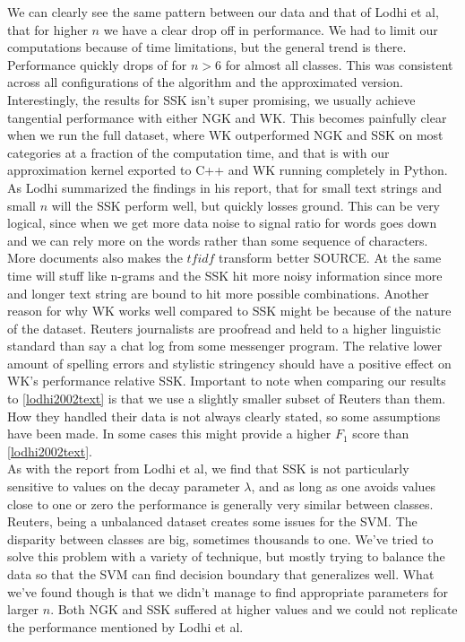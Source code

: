We can clearly see the same pattern between our data and that of Lodhi et al, that for higher $ n $ we have a clear drop off in performance. We had to limit our computations because of time limitations, but the general trend is there. Performance quickly drops of for $ n>6 $ for almost all classes. This was consistent across all configurations of the algorithm and the approximated version. Interestingly, the results for SSK isn't super promising, we usually achieve tangential performance with either NGK and WK. This becomes painfully clear when we run the full dataset, where WK outperformed NGK and SSK on most categories at a fraction of the computation time, and that is with our approximation kernel exported to C++ and WK running completely in Python. As Lodhi summarized the findings in his report, that for small text strings and small $ n $ will the SSK perform well, but quickly losses ground. This can be very logical, since when we get more data noise to signal ratio for words goes down and we can rely more on the words rather than some sequence of characters. More documents also makes the $ tfidf $ transform better SOURCE. At the same time will stuff like n-grams and the SSK hit more noisy information since more and longer text string are bound to hit more possible combinations. Another reason for why WK works well compared to SSK might be because of the nature of the dataset. Reuters journalists are proofread and held to a higher linguistic standard than say a chat log from some messenger program. The relative lower amount of spelling errors and stylistic stringency should have a positive effect on WK's performance relative SSK. Important to note when comparing our results to \ref{lodhi2002text} is that we use a slightly smaller subset of Reuters than them. How they handled their data is not always clearly stated, so some assumptions have been made. In some cases this might provide a higher $ F_1 $ score than \ref{lodhi2002text}.
\\
As with the report from Lodhi et al, we find that SSK is not particularly sensitive to values on the decay parameter $ \lambda $, and as long as one avoids values close to one or zero the performance is generally very similar between classes. Reuters, being a unbalanced dataset creates some issues for the SVM. The disparity between classes are big, sometimes thousands to one. We've tried to solve this problem with a variety of technique, but mostly trying to balance the data so that the SVM can find decision boundary that generalizes well. What we've found though is that we didn't manage to find appropriate parameters for larger $ n $. Both NGK and SSK suffered at higher values and we could not replicate the performance mentioned by Lodhi et al.  
